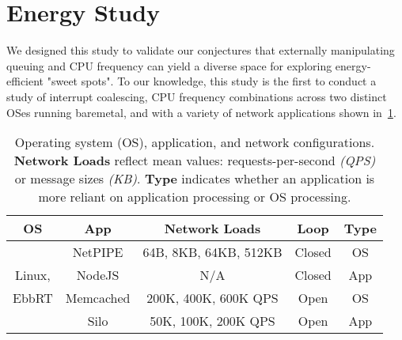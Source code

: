 \section{Energy Study}
\label{sec:study}
We designed this study to validate our conjectures that externally manipulating queuing and CPU frequency can yield a diverse space for exploring energy-efficient "sweet spots". To our knowledge, this study is the first to conduct a study of interrupt coalescing, CPU frequency combinations across two distinct OSes running baremetal, and with a variety of network applications shown in~\cref{table:wrkcfgs}.

\renewcommand{\tabcolsep}{2pt}
\begin{table}[t]
\small
\begin{tabular}{|c|c|c|c|c|}
    \hline
  OS & App & Network Loads & Loop & Type\\
  \hline
     & NetPIPE & 64B, 8KB, 64KB, 512KB & Closed & OS\\ \cline{2-5}
     Linux, & NodeJS & N/A & Closed & App \\ \cline{2-5}
   EbbRT & Memcached & 200K, 400K, 600K QPS & Open & OS\\ \cline{2-5}
   & Silo & 50K, 100K, 200K QPS & Open & App\\ \hline
\end{tabular}
\vspace{-10pt}
\caption{
Operating system (OS), application, and network configurations.
\textbf{Network Loads} reflect mean values: requests-per-second \textit{(QPS)} or message sizes \textit{(KB)}. \textbf{Type} indicates whether an application is more reliant on application processing or OS processing.}
\label{table:wrkcfgs}
\end{table}


